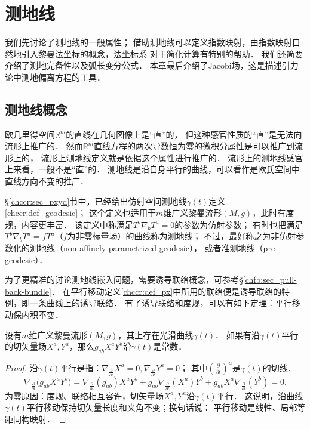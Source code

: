 
\chapter{测地线}\label{chgd}

我们先讨论了测地线的一般属性；
借助测地线可以定义指数映射，由指数映射自然地引入黎曼法坐标的概念，法坐标系
对于简化计算有特别的帮助．
我们还简要介绍了测地完备性以及弧长变分公式．
本章最后介绍了Jacobi场，这是描述引力论中测地偏离方程的工具．




\section{测地线概念}\label{chgd:sec_concept}
欧几里得空间$\mathbb{R}^m$的直线在几何图像上是“直”的，
但这种感官性质的“直”是无法向流形上推广的．
然而$\mathbb{R}^m$直线方程的两次导数恒为零的{\kaishu 微积分属性}是可以推广到流形上的，
流形上测地线定义就是依据这个属性进行推广的．
流形上的测地线感官上来看，一般不是“直”的．
测地线是沿自身平行的曲线，可以看作是欧氏空间中直线方向不变的推广．

\S \ref{chccr:sec_pxyd}节中，已经给出仿射空间测地线$\gamma(t)$定义\ref{chccr:def_geodesic}；
这个定义也适用于$m$维广义黎曼流形$(M,g)$，此时有度规，内容更丰富．
该定义中称满足$T^b \nabla _b T^a=0$的参数为仿射参数；
有时也把满足$T^b \nabla _b T^a =f T^a$（$f$为非零标量场）的曲线称为测地线；
不过，最好称之为{\kaishu 非仿射参数化的测地线（non-affinely parametrized geodesic）}，
或者{\kaishu 准测地线}（pre-geodesic）．


为了更精准的讨论测地线嵌入问题，需要诱导联络概念，可参考\S\ref{chfb:sec_pull-back-bundle}．
在平行移动定义\ref{chccr:def_px}中所用的联络便是诱导联络的特例，即一条曲线上的诱导联络．
有了诱导联络和度规，可以有如下定理：平行移动保内积不变．
\begin{theorem}\label{chgd:thm_parallel-metric}
    设有$m$维广义黎曼流形$(M,g)$，其上存在光滑曲线$\gamma(t)$．
    如果有沿$\gamma(t)$平行的切矢量场$X^a, Y^a$，那么$g_{ab}X^aY^b$沿$\gamma(t)$是常数．
\end{theorem}
\begin{proof}
    沿$\gamma(t)$平行是指：$\nabla_{\frac{\partial}{\partial t}}X^a=0,
     \nabla_{\frac{\partial}{\partial t}}Y^a=0$；
    其中$(\frac{\partial}{\partial t})^a$是$\gamma(t)$的切线．
    \begin{equation*}
        \nabla_{\frac{\partial}{\partial t}}\bigl( g_{ab}X^aY^b \bigr)
        =\nabla_{\frac{\partial}{\partial t}}( g_{ab} ) X^aY^b
        +g_{ab}\nabla_{\frac{\partial}{\partial t}}( X^a ) Y^b
        +g_{ab}X^a\nabla_{\frac{\partial}{\partial t}}( Y^b )     =0.
    \end{equation*}
    为零原因：度规、联络相互容许，切矢量场$X^a, Y^a$沿$\gamma(t)$平行．
    这说明，沿曲线$\gamma(t)$平行移动保持切矢量长度和夹角不变；换句话说：
    平行移动是线性、局部等距同构映射．
\end{proof}

